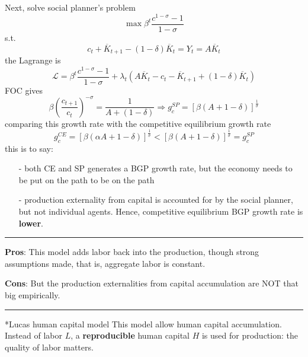 \documentclass[10pt,landscape,a4paper]{article}
\makeatletter
\let\bar\overline
\renewcommand{\subsection}{\@startsection{subsection}{1}{0mm}{.2ex}{.2ex}{\small\bfseries}}
\makeatother
\begin{document}
\begin{multicols*}{3}

\vspace{2pt}
Next, solve social planner's problem
$$
\max \beta^t \frac{c^{1-\sigma}-1}{1-\sigma}
$$
s.t.
$$
c_t + \bar{K}_{t+1}-(1-\delta)\bar{K}_t = Y_t=A\bar{K}_t
$$
the Lagrange is
$$
\mathcal{L} = \beta^t \frac{c^{1-\sigma}-1}{1-\sigma}+\lambda_t\left(A\bar{K}_t- c_t - \bar{K}_{t+1}+(1-\delta)\bar{K}_t\right)
$$
FOC gives
$$
\beta\left(\frac{c_{t+1}}{c_t}\right)^{-\sigma} = \frac{1}{A + (1-\delta)} \Rightarrow g_c^{SP} = \left[\beta \left(A+1-\delta\right) \right]^{\frac{1}{\sigma}}
$$
comparing this growth rate with the competitive equilibrium growth rate
$$
g_c^{CE}=\left[\beta \left(\alpha A+1-\delta\right) \right]^{\frac{1}{\sigma}} < \left[\beta \left(A+1-\delta\right) \right]^{\frac{1}{\sigma}} =g_c^{SP}
$$
this is to say:
\begin{itemize}
    \item[-] both CE and SP generates a BGP growth rate, but the economy needs to be put on the path to be on the path
    \item[-] production externality from capital is accounted for by the social planner, but not individual agents. Hence, competitive equilibrium BGP growth rate is \textbf{lower}.
\end{itemize}

\rule{0.325\textwidth}{0.4pt}

\vspace{2pt}

\textbf{Pros}: This model adds labor back into the production, though strong assumptions made, that is, aggregate labor is constant.

\textbf{Cons}: But the production externalities from capital accumulation are NOT that big empirically.

\rule{0.325\textwidth}{0.4pt}

\subsection*{Lucas human capital model}
This model allow human capital accumulation. Instead of labor $L$, a \textbf{reproducible} human capital $H$ is used for production: the quality of labor matters.


\end{multicols*}
\end{document}
